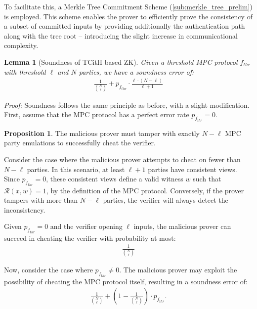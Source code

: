 \documentclass[11pt]{report}
\theoremstyle{definition}
\newtheorem{proposition}{Proposition}[section]
\theoremstyle{plain}
\newtheorem{lemma}{Lemma}[section]
\begin{document}
To facilitate this, a Merkle Tree Commitment Scheme (\autoref{sub:merkle_tree_prelim}) is employed. This scheme enables the prover to efficiently prove the consistency of a subset of committed inputs by providing additionally the authentication path along with the tree root -- introducing the slight increase in communicational complexity.

\begin{lemma}[Soundness of TCitH based ZK]
  Given a threshold MPC protocol $ f_{thr} $ with threshold $ \ell $ and $ N $ parties, we have a soundness error of:
  \begin{align*}
    \frac{1}{\binom{N}{\ell}} + p_{f_{thr}} \cdot \frac{\ell \cdot (N - \ell)}{\ell + 1}
  \end{align*}
\end{lemma}

\textit{Proof:} Soundness follows the same principle as before, with a slight modification. First, assume that the MPC protocol has a perfect error rate $  p_{f_{thr}} = 0  $.

\begin{proposition}
  The malicious prover must tamper with exactly $  N - \ell  $ MPC party emulations to successfully cheat the verifier.
\end{proposition}

Consider the case where the malicious prover attempts to cheat on fewer than $  N - \ell  $ parties. In this scenario, at least $  \ell + 1  $ parties have consistent views. Since $  p_{f_{thr}} = 0  $, these consistent views define a valid witness $  w  $ such that $  \mathcal{R}(x, w) = 1  $, by the definition of the MPC protocol. Conversely, if the prover tampers with more than $  N - \ell  $ parties, the verifier will always detect the inconsistency.

Given $  p_{f_{thr}} = 0  $ and the verifier opening $  \ell  $ inputs, the malicious prover can succeed in cheating the verifier with probability at most:
\begin{align*}
  \frac{1}{\binom{N}{\ell}}
\end{align*}

Now, consider the case where $  p_{f_{thr}} \neq 0  $. The malicious prover may exploit the possibility of cheating the MPC protocol itself, resulting in a soundness error of:
\begin{align*}
  \frac{1}{\binom{N}{\ell}} + \left(1 - \frac{1}{\binom{N}{\ell}}\right) \cdot p_{f_{thr}}.
\end{align*}
\end{document}
